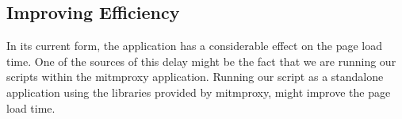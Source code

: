 \documentclass[a4paper,11pt,twocolumn]{article}
\begin{document}
\subsection{Improving Efficiency}
In its current form, the application has a considerable effect on the page load time. One of the sources of this delay might be the fact that we are running our scripts within the mitmproxy application. Running our script as a standalone application using the libraries provided by mitmproxy, might improve the page load time. 


\end{document}
